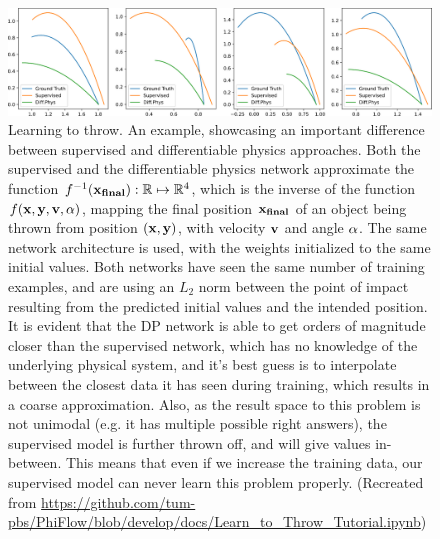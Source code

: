 \begin{figure}
  \centering
  \includegraphics[width=\textwidth]{figures/throwing_results}
  \caption{
    Learning to throw. 
    An example, showcasing an important difference between supervised and
    differentiable physics approaches. Both the supervised and the
    differentiable physics network approximate the function
    $f^{-1}(\vb{x_{final}}): \mathbb{R} \mapsto \mathbb{R}^4$, which is the
    inverse of the function $f(\vb{x}, \vb{y}, \vb{v}, \vb{\alpha})$, mapping
    the final position $\vb{x_{final}}$ of an object being thrown from position
    $(\vb{x}, \vb{y})$, with velocity $\vb{v}$ and angle $\vb{\alpha}$. The same
    network architecture is used, with the weights initialized to the same
    initial values. Both networks have seen the same number of training
    examples, and are using an $L_2$ norm between the point of impact resulting
    from the predicted initial values and the intended position. It is evident
    that the DP network is able to get orders of magnitude closer than the
    supervised network, which has no knowledge of the underlying physical
    system, and it's best guess is to interpolate between the closest data it
    has seen during training, which results in a coarse approximation. Also, as
    the result space to this problem is not unimodal (e.g. it has multiple
    possible right answers), the supervised model is further thrown off, and
    will give values in-between. This means that even if we increase the
    training data, our supervised model can never learn this problem properly.
    (Recreated from
    \url{https://github.com/tum-pbs/PhiFlow/blob/develop/docs/Learn_to_Throw_Tutorial.ipynb})
  }
    \label{fig:learning-to-throw}
\end{figure}
